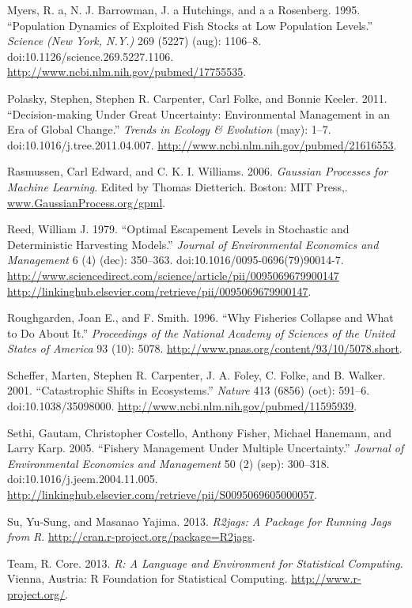 \documentclass[author-year, review]{elsarticle} %
\begin{document}
Myers, R. a, N. J. Barrowman, J. a Hutchings, and a a Rosenberg. 1995.
``Population Dynamics of Exploited Fish Stocks at Low Population
Levels.'' \emph{Science (New York, N.Y.)} 269 (5227) (aug): 1106--8.
doi:10.1126/science.269.5227.1106.
\url{http://www.ncbi.nlm.nih.gov/pubmed/17755535}.

Polasky, Stephen, Stephen R. Carpenter, Carl Folke, and Bonnie Keeler.
2011. ``Decision-making Under Great Uncertainty: Environmental
Management in an Era of Global Change.'' \emph{Trends in Ecology \&
Evolution} (may): 1--7. doi:10.1016/j.tree.2011.04.007.
\url{http://www.ncbi.nlm.nih.gov/pubmed/21616553}.

Rasmussen, Carl Edward, and C. K. I. Williams. 2006. \emph{Gaussian
Processes for Machine Learning}. Edited by Thomas Dietterich. Boston:
MIT Press,. \url{www.GaussianProcess.org/gpml}.

Reed, William J. 1979. ``Optimal Escapement Levels in Stochastic and
Deterministic Harvesting Models.'' \emph{Journal of Environmental
Economics and Management} 6 (4) (dec): 350--363.
doi:10.1016/0095-0696(79)90014-7.
\href{http://www.sciencedirect.com/science/article/pii/0095069679900147 http://linkinghub.elsevier.com/retrieve/pii/0095069679900147}{http://www.sciencedirect.com/science/article/pii/0095069679900147
http://linkinghub.elsevier.com/retrieve/pii/0095069679900147}.

Roughgarden, Joan E., and F. Smith. 1996. ``Why Fisheries Collapse and
What to Do About It.'' \emph{Proceedings of the National Academy of
Sciences of the United States of America} 93 (10): 5078.
\url{http://www.pnas.org/content/93/10/5078.short}.

Scheffer, Marten, Stephen R. Carpenter, J. A. Foley, C. Folke, and B.
Walker. 2001. ``Catastrophic Shifts in Ecosystems.'' \emph{Nature} 413
(6856) (oct): 591--6. doi:10.1038/35098000.
\url{http://www.ncbi.nlm.nih.gov/pubmed/11595939}.

Sethi, Gautam, Christopher Costello, Anthony Fisher, Michael Hanemann,
and Larry Karp. 2005. ``Fishery Management Under Multiple Uncertainty.''
\emph{Journal of Environmental Economics and Management} 50 (2) (sep):
300--318. doi:10.1016/j.jeem.2004.11.005.
\url{http://linkinghub.elsevier.com/retrieve/pii/S0095069605000057}.

Su, Yu-Sung, and Masanao Yajima. 2013. \emph{R2jags: A Package for
Running Jags from R}. \url{http://cran.r-project.org/package=R2jags}.

Team, R. Core. 2013. \emph{R: A Language and Environment for Statistical
Computing}. Vienna, Austria: R Foundation for Statistical Computing.
\url{http://www.r-project.org/}.
\end{document}
